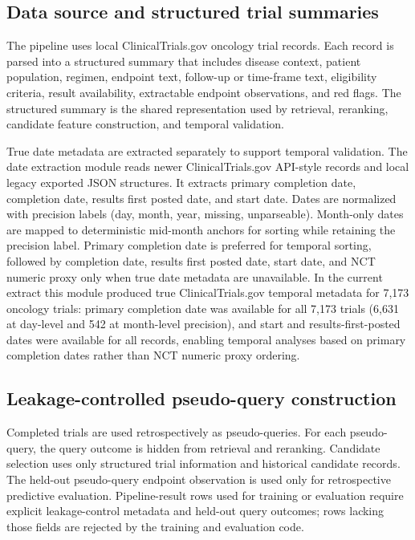 \documentclass[11pt]{article}
\begin{document}
\subsection{Data source and structured trial summaries}
\label{sec:data}
The pipeline uses local ClinicalTrials.gov oncology trial records. Each record
is parsed into a structured summary that includes disease context, patient
population, regimen, endpoint text, follow-up or time-frame text, eligibility
criteria, result availability, extractable endpoint observations, and red
flags. The structured summary is the shared representation used by retrieval,
reranking, candidate feature construction, and temporal validation.

True date metadata are extracted separately to support temporal validation.
The date extraction module reads newer ClinicalTrials.gov API-style records
and local legacy exported JSON structures. It extracts primary completion
date, completion date, results first posted date, and start date. Dates are
normalized with precision labels (day, month, year, missing, unparseable).
Month-only dates are mapped to deterministic mid-month anchors for sorting
while retaining the precision label. Primary completion date is preferred for
temporal sorting, followed by completion date, results first posted date,
start date, and NCT numeric proxy only when true date metadata are
unavailable. In the current extract this module produced true
ClinicalTrials.gov temporal metadata for 7{,}173 oncology trials: primary
completion date was available for all 7{,}173 trials (6{,}631 at day-level and
542 at month-level precision), and start and results-first-posted dates were
available for all records, enabling temporal analyses based on primary
completion dates rather than NCT numeric proxy ordering.

\subsection{Leakage-controlled pseudo-query construction}
Completed trials are used retrospectively as pseudo-queries. For each
pseudo-query, the query outcome is hidden from retrieval and reranking.
Candidate selection uses only structured trial information and historical
candidate records. The held-out pseudo-query endpoint observation is used only
for retrospective predictive evaluation. Pipeline-result rows used for
training or evaluation require explicit leakage-control metadata and held-out
query outcomes; rows lacking those fields are rejected by the training and
evaluation code.
\end{document}
